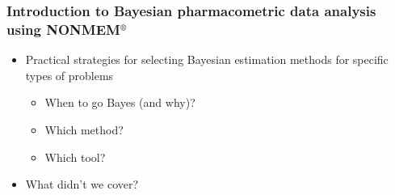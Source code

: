 \documentclass[handout]{beamer}
\begin{document}
\begin{frame}
  \frametitle{Introduction to Bayesian pharmacometric data analysis
    using NONMEM$^\text{\textregistered}$}
  
  \begin{itemize}
  \item Practical strategies for selecting Bayesian estimation methods
    for specific types of problems
    \begin{itemize}
    \item When to go Bayes (and why)?
    \item Which method?
    \item Which tool?
    \end{itemize}
  \item What didn't we cover?
  \end{itemize}

\end{frame}

\end{document}
